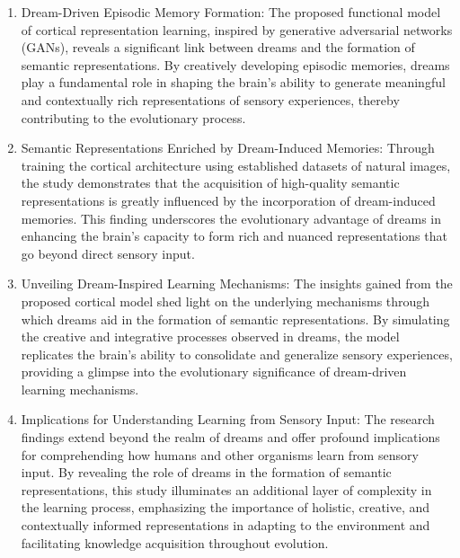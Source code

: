 \documentclass{midl} %
\begin{document}
\begin{enumerate}
 
 \item Dream-Driven Episodic Memory Formation: The proposed functional model of cortical representation learning, inspired by generative adversarial networks (GANs), reveals a significant link between dreams and the formation of semantic representations. By creatively developing episodic memories, dreams play a fundamental role in shaping the brain's ability to generate meaningful and contextually rich representations of sensory experiences, thereby contributing to the evolutionary process.

 \item Semantic Representations Enriched by Dream-Induced Memories: Through training the cortical architecture using established datasets of natural images, the study demonstrates that the acquisition of high-quality semantic representations is greatly influenced by the incorporation of dream-induced memories. This finding underscores the evolutionary advantage of dreams in enhancing the brain's capacity to form rich and nuanced representations that go beyond direct sensory input.

 \item Unveiling Dream-Inspired Learning Mechanisms: The insights gained from the proposed cortical model shed light on the underlying mechanisms through which dreams aid in the formation of semantic representations. By simulating the creative and integrative processes observed in dreams, the model replicates the brain's ability to consolidate and generalize sensory experiences, providing a glimpse into the evolutionary significance of dream-driven learning mechanisms.

 \item Implications for Understanding Learning from Sensory Input: The research findings extend beyond the realm of dreams and offer profound implications for comprehending how humans and other organisms learn from sensory input. By revealing the role of dreams in the formation of semantic representations, this study illuminates an additional layer of complexity in the learning process, emphasizing the importance of holistic, creative, and contextually informed representations in adapting to the environment and facilitating knowledge acquisition throughout evolution.
\end{enumerate}
\end{document}
